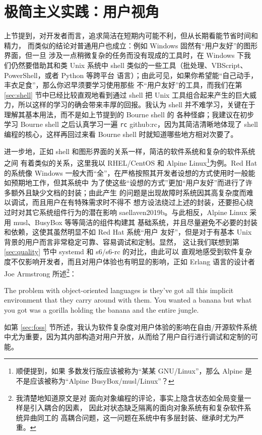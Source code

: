 \section{极简主义实践：用户视角}\label{sec:user}

上节提到，对开发者而言，追求简洁在短期内可能不利，但从长期看能节省时间和精力，
而类似的结论对普通用户也成立：例如 Windows 固然有“用户友好”的图形界面，但一旦
涉及一点稍微复杂的任务而没有现成的工具时，在 Windows 下我们仍然要借助其和类 Unix
系统中 shell 类似的一些工具（批处理、VBScript、PowerShell，或者 Python 等跨平台
语言）；由此可见，如果你希望能“自己动手，丰衣足食”，那么你迟早须要学习使用那些
不“用户友好”的工具，而我们在第 \ref{sec:shell} 节中已经比较直观地看到通过 shell
把 Unix 工具组合起来产生的巨大威力，所以这样的学习的确会带来丰厚的回报。我认为
shell 并不难学习，关键在于理解其基本用法，而不是如上节提到的 Bourne shell 的
各种怪癖；我建议在初步学习 Bourne shell 之后认真学习一遍 \verb|rc|\cupercite%
{github:rc}，因为其简洁清晰地体现了 shell 编程的核心，这样再回过来看 Bourne
shell 时就知道哪些地方相对次要了。

进一步地，正如 shell 和图形界面的关系一样，简洁的软件系统和复杂的软件系统之间
有着类似的关系，这里我以 RHEL/CentOS 和 Alpine Linux\footnote{顺便提到，如果
多数发行版应该被称为“某某 GNU/Linux”，那么 Alpine
是不是应该被称为“Alpine BusyBox/musl/Linux”？}为例。Red Hat 的系统像 Windows
一般大而“全”，在严格按照其开发者设想的方式使用时一般能如预期地工作，但其系统中
为了使这些“设想的方式”更加“用户友好”而进行了许多额外且缺少文档的封装；由此产生
的问题是出现故障时系统因其高复杂度而难以调试，而且用户在有特殊需求时不得不
想方设法绕过上述的封装，还要担心绕过时对其它系统组件行为的潜在影响\cupercite%
{saellaven2019b}。与此相反，Alpine Linux 采用 musl、BusyBox 等等简洁的组件构建其
基础系统，并且尽量避免不必要的封装和依赖，这使其虽然明显不如 Red Hat 系统“用户
友好”，但是对于有基本 Unix 背景的用户而言非常稳定可靠、容易调试和定制。显然，
这让我们联想到第 \ref{sec:quality} 节中 systemd 和 s6/s6-rc 的对比，由此可以
直观地感受到软件复杂度不仅影响开发者，而且对用户体验也有明显的影响，正如
Erlang 语言的设计者 Joe Armstrong 所述\footnote{我清楚地知道原文是对
面向对象编程的评论，事实上隐含状态如全局变量一样是引入耦合的因素，
因此对状态缺乏隔离的面向对象系统有和复杂软件系统异曲同工的
高耦合问题，这一问题在系统中有多层封装、继承时尤为严重。}：
\begin{quoting}
	The problem with object-oriented languages is they've got all this implicit
	environment that they carry around with them.  You wanted a banana but what
	you got was a gorilla holding the banana and the entire jungle.
\end{quoting}
如第 \ref{sec:foss} 节所述，我认为软件复杂度对用户体验的影响在自由/开源软件系统
中尤为重要，因为其内部构造对用户开放，从而给了用户自行进行调试和定制的可能。

